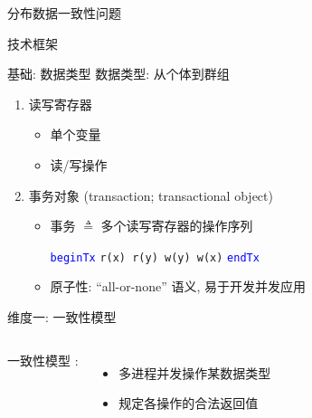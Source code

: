 \begin{frame}{分布数据一致性问题}
\end{frame}
\begin{frame}{技术框架}
\end{frame}
% 	  
\begin{frame}[fragile]{基础: 数据类型}
  数据类型: 从个体到群组
  \begin{enumerate}
	\setlength{\itemsep}{3pt}
	\item 读写寄存器~\footnotemark[1]
	  \begin{itemize}
		\item 单个变量
		\item 读/写操作
	  \end{itemize}
	  \pause
	\item 事务对象 {\small (transaction; transactional object)}
	  \begin{itemize}
		\setlength{\itemsep}{3pt}
		\item 事务 $\triangleq$ 多个读写寄存器的操作序列\\
		  \begin{center}
			\textcolor{blue}{\texttt{beginTx}} \texttt{r(x) r(y) w(y) w(x)} \textcolor{blue}{\texttt{endTx}}
		  \end{center}
		\item 原子性: ``all-or-none'' 语义, 易于开发并发应用
	  \end{itemize}
  \end{enumerate}
\end{frame}
\begin{frame}{维度一: 一致性模型}
  \begin{columns}
	  一致性模型  :
	  \vspace{0.20cm}
	  \begin{itemize}
		\item 多进程并发操作某数据类型
		\item 规定各操作的合法返回值
	  \end{itemize}
  \end{columns}

\end{frame}
